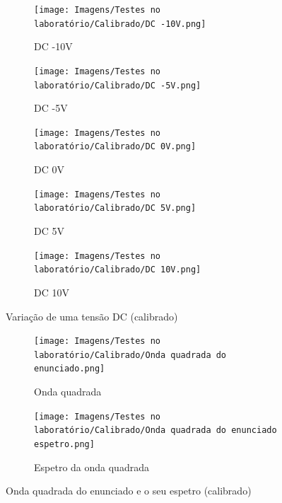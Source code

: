 \begin{figure}[H]
    \centering
    \begin{subfigure}{0.35\textwidth}
        \centering
        \texttt{[image: Imagens/Testes no laboratório/Calibrado/DC -10V.png]}
        \captionsetup{justification=centering}
        \caption{DC -10V}
        \label{fig:DC -10V calibrado}
    \end{subfigure}
    \begin{subfigure}{0.35\textwidth}
        \centering
        \texttt{[image: Imagens/Testes no laboratório/Calibrado/DC -5V.png]}
        \captionsetup{justification=centering}
        \caption{DC -5V}
        \label{fig:DC -5V calibrado}
    \end{subfigure}
    \begin{subfigure}{0.35\textwidth}
        \centering
        \texttt{[image: Imagens/Testes no laboratório/Calibrado/DC 0V.png]}
        \captionsetup{justification=centering}
        \caption{DC 0V}
        \label{fig:DC 0V calibrado}
    \end{subfigure}
    \begin{subfigure}{0.35\textwidth}
        \centering
        \texttt{[image: Imagens/Testes no laboratório/Calibrado/DC 5V.png]}
        \captionsetup{justification=centering}
        \caption{DC 5V}
        \label{fig:DC 5V calibrado}
    \end{subfigure}
    \begin{subfigure}{0.35\textwidth}
        \centering
        \texttt{[image: Imagens/Testes no laboratório/Calibrado/DC 10V.png]}
        \captionsetup{justification=centering}
        \caption{DC 10V}
        \label{fig:DC 10V calibrado}
    \end{subfigure}
    \captionsetup{justification=centering}
    \caption{Variação de uma tensão DC (calibrado)}
    \label{fig:Variação de uma tensão DC (calibrado)}
\end{figure}

\begin{figure}[H]
    \centering
    \begin{subfigure}{0.35\textwidth}
        \centering
        \texttt{[image: Imagens/Testes no laboratório/Calibrado/Onda quadrada do enunciado.png]}
        \captionsetup{justification=centering}
        \caption{Onda quadrada}
        \label{fig:Onda quadrada calibrado}
    \end{subfigure}
    \begin{subfigure}{0.35\textwidth}
        \centering
        \texttt{[image: Imagens/Testes no laboratório/Calibrado/Onda quadrada do enunciado espetro.png]}
        \captionsetup{justification=centering}
        \caption{Espetro da onda quadrada}
        \label{fig:Espetro da onda quadrada calibrado}
    \end{subfigure}
    \captionsetup{justification=centering}
    \caption{Onda quadrada do enunciado e o seu espetro (calibrado)}
    \label{fig:Onda quadrada do enunciado e o seu espetro (calibrado)}
\end{figure}

